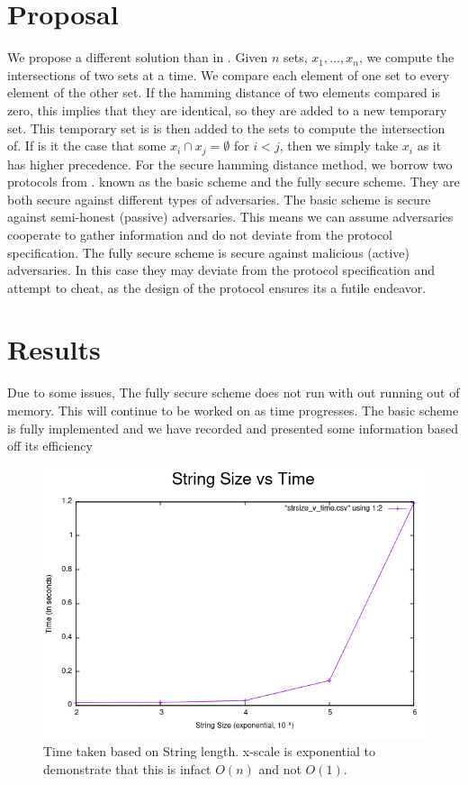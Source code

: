 \documentclass[10pt]{article}
\begin{document}
\section{Proposal}
We propose a different solution than in \cite{polynomial}. Given $n$ sets, $x_1,...,x_n$, we compute the intersections of two sets at a time. We compare each element of one set to every element of the other set. If the hamming distance of two elements compared is zero, this implies that they are identical, so they are added to a new temporary set. This temporary set is is then added to the sets to compute the intersection of. If is it the case that some $x_i \cap x_j = \emptyset$ for $i  < j$, then we simply take $x_i$ as it has higher precedence. For the secure hamming distance method, we borrow two protocols from \cite{shade}. known as the basic scheme and the fully secure scheme. They are both secure against different types of adversaries. The basic scheme is secure against semi-honest (passive) adversaries. This means we can assume adversaries cooperate to gather information and do not deviate from the protocol specification. The fully secure scheme is secure against malicious (active) adversaries. In this case they may deviate from the protocol specification and attempt to cheat, as the design of the protocol ensures its a futile endeavor. 


\section{Results}
Due to some issues, The fully secure scheme does not run with out running out of memory. This will continue to be worked on as time progresses. The basic scheme is fully implemented and we have recorded and presented some information based off its efficiency

\begin{figure}[ht!]
\centering
\includegraphics[scale=0.64]{h1} 
\caption{Time taken based on String length. x-scale is exponential to demonstrate that this is infact $O(n)$ and not $O(1)$.}
\end{figure}
\end{document}
